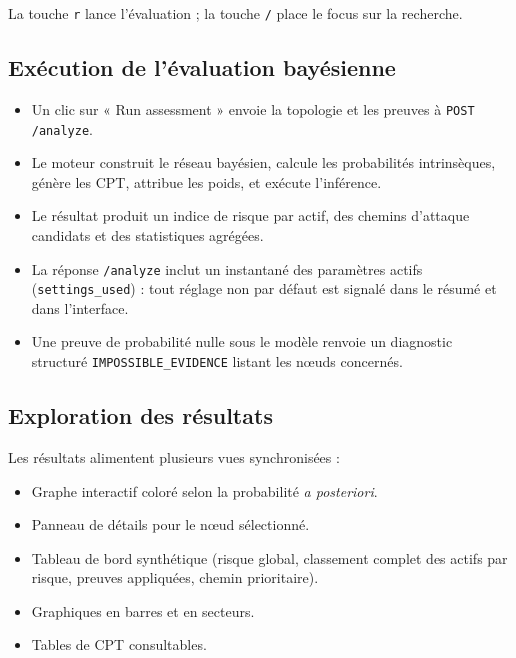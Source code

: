 \documentclass[12pt,a4paper]{article}
\newcommand{\forcereset}[1]{}
\begin{document}
\begin{notebox}
La touche \texttt{r} lance l'évaluation ; la touche \texttt{/} place le focus sur la recherche.
\end{notebox}

\subsection{Exécution de l'évaluation bayésienne}
\forcereset{6}

\begin{itemize}[leftmargin=1.2cm, itemsep=0.2\baselineskip]
    \item Un clic sur « Run assessment » envoie la topologie et les preuves à \texttt{POST /analyze}.
    \item Le moteur construit le réseau bayésien, calcule les probabilités intrinsèques, génère les CPT, attribue les poids, et exécute l'inférence.
    \item Le résultat produit un indice de risque par actif, des chemins d'attaque candidats et des statistiques agrégées.
    \item La réponse \texttt{/analyze} inclut un instantané des paramètres actifs (\texttt{settings\_used}) : tout réglage non par défaut est signalé dans le résumé et dans l'interface.
    \item Une preuve de probabilité nulle sous le modèle renvoie un diagnostic structuré \texttt{IMPOSSIBLE\_EVIDENCE} listant les nœuds concernés.
\end{itemize}

\subsection{Exploration des résultats}
\forcereset{5}

Les résultats alimentent plusieurs vues synchronisées :

\begin{itemize}[leftmargin=1.2cm, itemsep=0.2\baselineskip]
    \item Graphe interactif coloré selon la probabilité \emph{a posteriori}.
    \item Panneau de détails pour le nœud sélectionné.
    \item Tableau de bord synthétique (risque global, classement complet des actifs par risque, preuves appliquées, chemin prioritaire).
    \item Graphiques en barres et en secteurs.
    \item Tables de CPT consultables.
\end{itemize}
\end{document}
